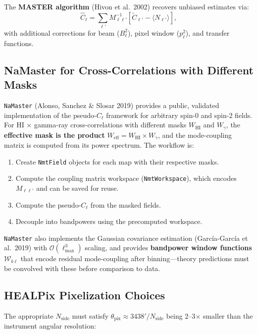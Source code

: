 \documentclass[10pt,a4paper]{article}
\newcommand{\Cl}{C_\ell}
\begin{document}
The \textbf{MASTER algorithm} (Hivon et al.\ 2002) recovers unbiased estimates via:
\begin{equation}
\hat{C}_\ell = \sum_{\ell'} M_{\ell\ell'}^{-1}
\left[\tilde{C}_{\ell'} - \langle N_{\ell'}\rangle\right],
\label{eq:master}
\end{equation}
with additional corrections for beam ($B_\ell^2$), pixel window ($p_\ell^2$), and transfer functions.


\subsection{NaMaster for Cross-Correlations with Different Masks}

\texttt{NaMaster} (Alonso, Sanchez \& Slosar 2019) provides a public, validated implementation of the pseudo-$\Cl$ framework for arbitrary spin-0 and spin-2 fields. For HI $\times$ gamma-ray cross-correlations with different masks $W_{\mathrm{HI}}$ and $W_\gamma$, the \textbf{effective mask is the product} $W_{\mathrm{eff}} = W_{\mathrm{HI}} \times W_\gamma$, and the mode-coupling matrix is computed from its power spectrum. The workflow is:
\begin{enumerate}[leftmargin=2em]
\item Create \texttt{NmtField} objects for each map with their respective masks.
\item Compute the coupling matrix workspace (\texttt{NmtWorkspace}), which encodes $M_{\ell\ell'}$ and can be saved for reuse.
\item Compute the pseudo-$\Cl$ from the masked fields.
\item Decouple into bandpowers using the precomputed workspace.
\end{enumerate}
\texttt{NaMaster} also implements the Gaussian covariance estimation (Garc\'ia-Garc\'ia et al.\ 2019) with $\mathcal{O}(\ell_{\max}^3)$ scaling, and provides \textbf{bandpower window functions} $\mathcal{W}_{b\ell}$ that encode residual mode-coupling after binning---theory predictions must be convolved with these before comparison to data.


\subsection{HEALPix Pixelization Choices}

The appropriate $N_{\mathrm{side}}$ must satisfy $\theta_{\mathrm{pix}} \approx 3438'/N_{\mathrm{side}}$ being 2--3$\times$ smaller than the instrument angular resolution:
\end{document}
